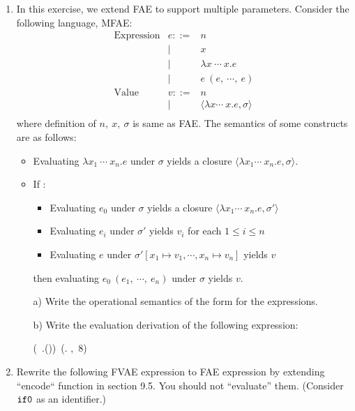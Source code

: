 \begin{enumerate}
\item In this exercise, we extend FAE to support multiple parameters. Consider the following language, MFAE:
\[
\begin{array}{lrll}
\text{Expression}& e ::= & n\\
&\mid& x\\
&\mid& \lambda x\ \cdots\ x. e\\
&\mid& e\ (e,\ \cdots ,\ e)\\
\text{Value}& v ::= & n \\
&\mid& \langle \lambda x \cdots\ x.e,\sigma \rangle \\
\end{array}
\]
where definition of $n,\ x,\ \sigma$ is same as FAE.
The semantics of some constructs are as follows:
\begin{itemize}
  \item Evaluating $\lambda x_1\ \cdots\ x_n. e$ under $\sigma$
      yields a closure $\langle \lambda x_1 \cdots\ x_n.e,\sigma \rangle$.
  \item If :
    \begin{itemize}
    \item Evaluating $e_0$ under $\sigma$ yields a closure $\langle \lambda x_1 \cdots\ x_n.e,\sigma' \rangle$
    \item Evaluating $e_i$ under $\sigma'$ yields $v_i$ for each $1 \leq i \leq n$
    \item Evaluating $e$ under $\sigma'[x_1 \mapsto v_1, \cdots, x_n \mapsto v_n]$ yields $v$
    \end{itemize}
\item[] then evaluating $e_0\ (e_1,\ \cdots ,\ e_n)$ under $\sigma$ yields $v$.
\end{itemize}

\begin{itemize}
  \item[a)] Write the operational semantics of the form  for the expressions.
  \item[b)] Write the evaluation derivation of the following expression:

\derive
{\hspace*{\textwidth}}
{\emptyset\vdash (\lambda {}\ .())\
(\lambda \cx. \cx,\ 8) \Rightarrow~~~~~~~~}
\end{itemize}

\item Rewrite the following FVAE expression to FAE expression by extending ``encode`` function in section 9.5.
You should not ``evaluate'' them. (Consider $\texttt{if0}$ as an identifier.)


\end{enumerate}
